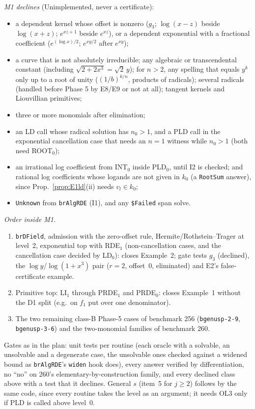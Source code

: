 \documentclass[11pt]{article}
\theoremstyle{definition}
\theoremstyle{remark}
\newcommand{\code}[1]{\texttt{#1}}
\begin{document}
\emph{M1 declines} (Unimplemented, never a certificate):
\begin{itemize}
\item a dependent kernel whose offset is nonzero ($g_3$; $\log(x-z)$ beside $\log(x+z)$;
  $e^{xz+1}$ beside $e^{xz}$), or a dependent exponential with a fractional coefficient
  ($e^{(\log x)/2}$; $e^{xy/2}$ after $e^{xy}$);
\item a curve that is not absolutely irreducible; any algebraic or transcendental constant
  (including $\sqrt{2+2x^3}=\sqrt2\,y$); for $n>2$, any spelling that equals $y^k$ only up to a
  root of unity ($(1/b)^{k/n}$, products of radicals); several radicals (handled before Phase 5 by E8/E9 or not
  at all); tangent kernels and Liouvillian primitives;
\item three or more monomials after elimination;
\item an LD call whose radical solution has $n_0>1$, and a PLD call in the exponential
  cancellation case that needs an $n=1$ witness while $n_0>1$ (both need ROOT$_0$);
\item an irrational log coefficient from INT$_0$ inside PLD$_0$, until I2 is checked; and
  rational log coefficients whose logands are not given in $k_0$ (a \code{RootSum} answer), since
  Prop.~\ref{prop:E1ld}(ii) needs $v_l\in k_0$;
\item \code{Unknown} from \code{brAlgRDE} (I1), and any \code{\$Failed} span solve.
\end{itemize}

\emph{Order inside M1.}
\begin{enumerate}
\item[M1a] \code{brDField}, admission with the zero-offset rule, Hermite/Rothstein--Trager at
  level~2, exponential top with RDE$_1$ (non-cancellation cases, and the cancellation case
  decided by LD$_0$): closes Example~2; gate tests $g_3$ (declined), the $\log y$/$\log(1+x^3)$
  pair ($r=2$, offset~0, eliminated) and E2's false-certificate example.
\item[M1b] Primitive top: LI$_1$ through PRDE$_1$ and PRDE$_0$: closes Example~1 without the
  D1 split (e.g.\ on $f_1$ put over one denominator).
\item[M1c] The two remaining class-B Phase-5 cases of benchmark 256 (\code{bgenusp-2-9},
  \code{bgenusp-3-6}) and the two-monomial families of benchmark 260.
\end{enumerate}
Gates as in the plan: unit tests per routine (each oracle with a solvable, an unsolvable and a
degenerate case, the unsolvable ones checked against a widened bound as \code{brAlgRDE}'s
\code{widen} hook does), every answer verified by differentiation, no ``no'' on 260's
elementary-by-construction family, and every declined class above with a test that it declines.
General $s$ (item~5 for $j\ge2$) follows by the same code, since every routine takes the level
as an argument; it needs OL3 only if PLD is called above level~0.
\end{document}
